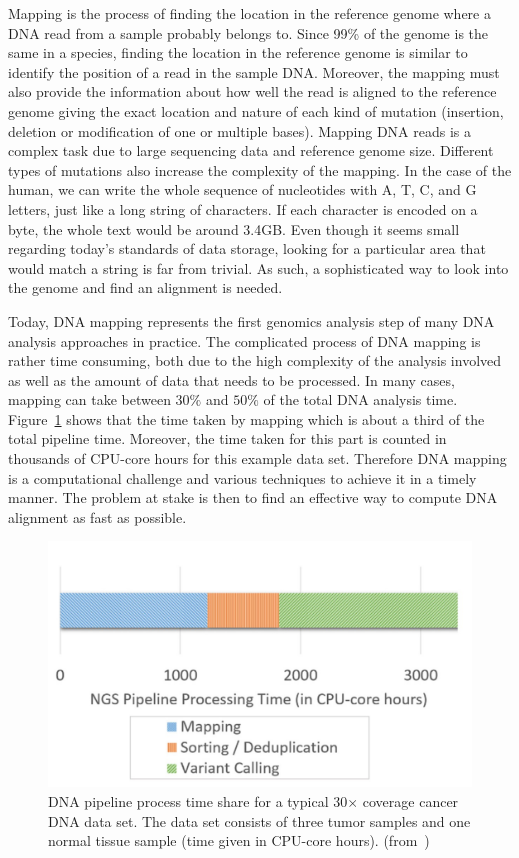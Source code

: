 Mapping is the process of finding the location in the reference genome where a DNA read from a sample probably belongs to. Since 99\% of the genome is the same in a species, finding the location in the reference genome is similar to identify the position of a read in the sample DNA. Moreover, the mapping must also provide the information about how well the read is aligned to the reference genome giving the exact location and nature of each kind of mutation (insertion, deletion or modification of one or multiple bases). Mapping DNA reads is a complex task due to large sequencing data and reference genome size. Different types of mutations also increase the complexity of the mapping. In the case of the human, we can write the whole sequence of nucleotides with A, T, C, and G letters, just like a long string of characters. If each character is encoded on a byte, the whole text would be around 3.4GB. Even though it seems small regarding today's standards of data storage, looking for a particular area that would match a string is far from trivial. As such, a sophisticated way to look into the genome and find an alignment is needed.


Today, DNA mapping represents the first genomics analysis step of many DNA analysis approaches in practice. The complicated process of DNA mapping is rather time consuming, both due to the high complexity of the analysis involved as well as the amount of data that needs to be processed. In many cases, mapping can take between $30\%$ and $50\%$ of the total DNA analysis time. Figure~\ref{fig:pipelineprocesstime} shows that the time taken by mapping which is about a third of the total pipeline time. Moreover, the time taken for this part is counted in thousands of CPU-core hours for this example data set. Therefore DNA mapping is a computational challenge and various techniques to achieve it in a timely manner. The problem at stake is then to find an effective way to compute DNA alignment as fast as possible.

\begin{figure}[h]
	\centering
	\includegraphics[width=1\linewidth]{pipelineprocesstime}
	\caption{DNA pipeline process time share for a typical 30$\times$ coverage cancer DNA data set. The data set consists of three tumor samples and one normal tissue sample (time given in CPU-core hours). (from~\cite{HOUTGAST201854})}
	\label{fig:pipelineprocesstime}
\end{figure}


